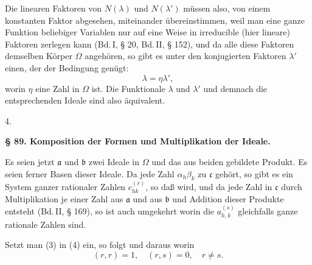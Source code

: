 Die linearen Faktoren von $N(\lambda)$ und $N(\lambda')$ müssen also, von einem konstanten Faktor abgesehen, miteinander übereinstimmen, weil man eine ganze Funktion beliebiger Variablen nur auf eine Weise in irreducible (hier lineare) Faktoren zerlegen kann (Bd.\,I, § 20, Bd.\,II, § 152), und da alle diese Faktoren demselben Körper $\Omega$ angehören, so gibt es unter den konjugierten Faktoren $\lambda'$ einen, der der Bedingung genügt:
\[
\lambda = \eta\lambda',
\]
worin $\eta$ eine Zahl in $\Omega$ ist. Die Funktionale $\lambda$ und $\lambda'$ und demnach die entsprechenden Ideale sind also äquivalent.

4. 

\begin{center}
\textbf{§ 89. Komposition der Formen und Multiplikation der Ideale.}
\end{center}

Es seien jetzt $\mathfrak{a}$ und $\mathfrak{b}$ zwei Ideale in $\Omega$ und
das aus beiden gebildete Produkt. Es seien ferner
Basen dieser Ideale. Da jede Zahl $\alpha_h\beta_k$ zu $\mathfrak{c}$ gehört, so gibt es ein System ganzer rationaler Zahlen $c^{(r)}_{hk}$, so daß
wird, und da jede Zahl in $\mathfrak{c}$ durch Multiplikation je einer Zahl aus $\mathfrak{a}$ und aus $\mathfrak{b}$ und Addition dieser Produkte entsteht (Bd.\,II, § 169), so ist auch umgekehrt
worin die $a^{(s)}_{h,k}$ gleichfalls ganze rationale Zahlen sind.

Setzt man (3) in (4) ein, so folgt
und daraus
worin
\[
(r,r) = 1, \quad (r,s) = 0, \quad r \neq s.
\]

